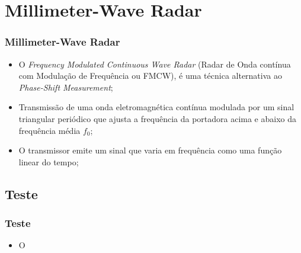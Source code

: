 \documentclass[xcolor=dvipsnames, aspectratio=169]{beamer}
\begin{document}
\section[Millimeter-Wave Radar]{Millimeter-Wave Radar} 
\begin{frame}
\frametitle{Millimeter-Wave Radar}
	\begin{itemize}
		\item O \textit{Frequency Modulated Continuous Wave Radar} (Radar de Onda contínua com Modulação de Frequência ou FMCW), é uma técnica alternativa ao \textit{Phase-Shift Measurement};
		\item Transmissão de uma onda eletromagnética contínua modulada por um sinal triangular periódico que ajusta a frequência da portadora acima e abaixo da frequência média $f_{0}$;
		\item O transmissor emite um sinal que varia em frequência como uma função linear do tempo;
	\end{itemize}
\end{frame}


\subsection[Teste]{Teste} 
\begin{frame}
\frametitle{Teste}
	\begin{itemize}
		\item O
	\end{itemize}
\end{frame}



\begin{frame}
    \printbibliography
\end{frame}


\begin{frame}
\titlepage %
\end{frame}
\end{document}
